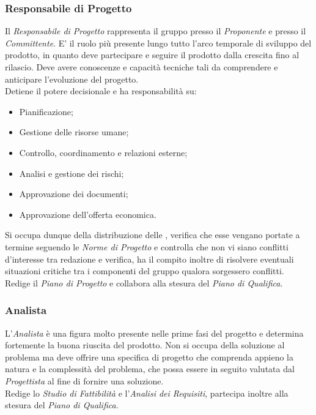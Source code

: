\documentclass{scalatekids-article}
\begin{document}
\subsubsection{Responsabile di Progetto}

Il \textit{Responsabile di Progetto} rappresenta il gruppo presso il \textit{Proponente}
e presso il \textit{Committente}. E' il ruolo più presente lungo tutto l'arco temporale di
sviluppo del prodotto, in quanto deve partecipare e seguire il prodotto dalla
crescita fino al rilascio. Deve avere conoscenze e capacità
tecniche tali da comprendere e anticipare l'evoluzione del progetto.\\
Detiene il potere decisionale e ha responsabilità su:
\begin{itemize}
\item Pianificazione;
\item Gestione delle risorse umane;
\item Controllo, coordinamento e relazioni esterne;
\item Analisi e gestione dei rischi;
\item Approvazione dei documenti;
\item Approvazione dell'offerta economica.
\end{itemize}
Si occupa dunque della distribuzione delle , verifica che esse vengano
portate a termine seguendo le \textit{Norme di Progetto} e controlla che non vi
siano conflitti d'interesse tra redazione e verifica, ha il compito inoltre di
risolvere eventuali situazioni critiche tra i componenti del gruppo qualora
sorgessero conflitti.\\ Redige il \textit{Piano di Progetto} e collabora alla
stesura del \textit{Piano di Qualifica}.

\subsubsection{Analista}

L'\textit{Analista} è una figura molto presente nelle prime fasi del progetto e
determina fortemente la buona riuscita del prodotto. Non si occupa della
soluzione al problema ma deve offrire una specifica di progetto che comprenda
appieno la natura e la complessità del problema, che possa essere in seguito
valutata dal \textit{Progettista} al fine di fornire una soluzione.\\ Redige lo
\textit{Studio di Fattibilità} e l'\textit{Analisi dei Requisiti}, partecipa
inoltre alla stesura del \textit{Piano di Qualifica}.
\end{document}
